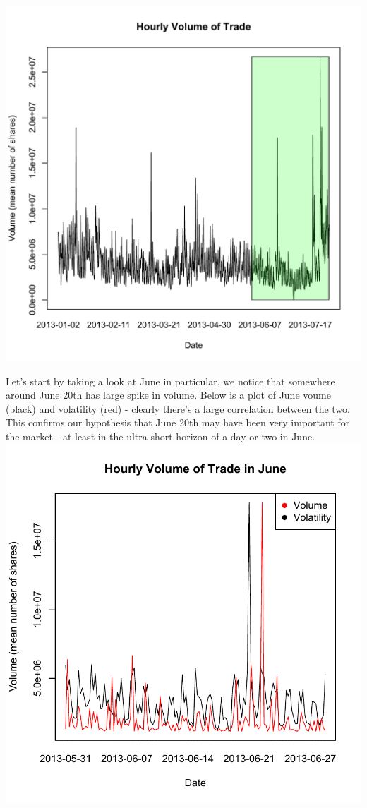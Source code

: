 \documentclass[11pt]{amsart}
\begin{document}
\includegraphics[scale=0.7]{june_july_volume.pdf} \\

\newpage

Let's start by taking a look at June in particular, we notice that somewhere around June 20th has large spike in volume. Below is a plot of June voume (black) and volatility (red) - clearly there's a large correlation between the two. This confirms our hypothesis that June 20th may have been very important for the market - at least in the ultra short horizon of a day or two in June. \\

\includegraphics[scale=0.5]{june_volume_volatility.pdf} \\
\end{document}
